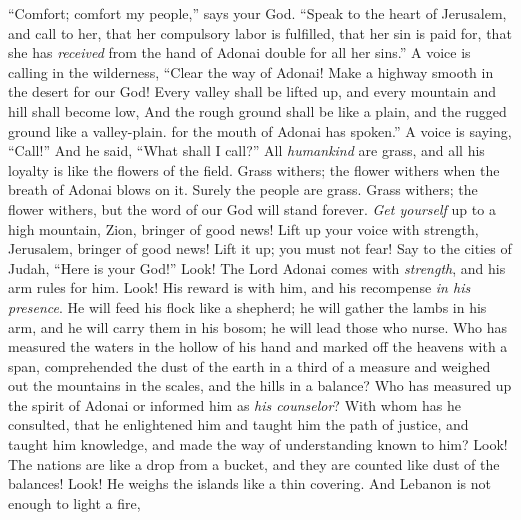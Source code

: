 \begin{biblechapter} %
 “Comfort; comfort my people,” says your God.
\verse “Speak to the heart of Jerusalem, and call to her,
\verse that her compulsory labor is fulfilled, that her sin is paid for, 
that she has \textit{received} from the hand of Adonai double for all her sins.”
\verse A voice is calling in the wilderness, “Clear the way of Adonai! 
Make a highway smooth in the desert for our God!
\verse Every valley shall be lifted up, 
and every mountain and hill shall become low, 
And the rough ground shall be like a plain, 
and the rugged ground like a valley-plain. for the mouth of Adonai has spoken.”
\verse A voice is saying, “Call!” 
And he said, “What shall I call?” 
All \textit{humankind} are grass, 
and all his loyalty is like the flowers of the field.
\verse Grass withers; the flower withers 
when the breath of Adonai blows on it. 
Surely the people are grass.
\verse Grass withers; the flower withers, 
but the word of our God will stand forever.
\verse \textit{Get yourself} up to a high mountain, Zion, bringer of good news! 
Lift up your voice with strength, Jerusalem, bringer of good news! 
Lift it up; you must not fear! 
Say to the cities of Judah, “Here is your God!”
\verse Look! The Lord Adonai comes with \textit{strength}, 
and his arm rules for him. 
Look! His reward is with him, 
and his recompense \textit{in his presence}.
\verse He will feed his flock like a shepherd; 
he will gather the lambs in his arm, 
and he will carry them in his bosom; 
he will lead those who nurse.
\verse Who has measured the waters in the hollow of his hand 
and marked off the heavens with a span, 
comprehended the dust of the earth in a third of a measure 
and weighed out the mountains in the scales, and the hills in a balance?
\verse Who has measured up the spirit of Adonai 
or informed him as \textit{his counselor}?
\verse With whom has he consulted, that he enlightened him 
and taught him the path of justice, 
and taught him knowledge, 
and made the way of understanding known to him?
\verse Look! The nations are like a drop from a bucket, 
and they are counted like dust of the balances! 
Look! He weighs the islands like a thin covering.
\verse And Lebanon is not enough to light a fire, 

\end{biblechapter}
